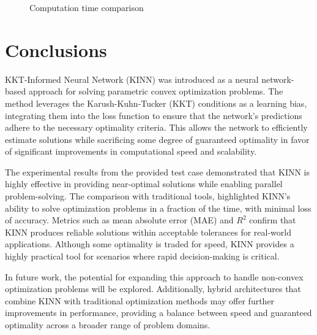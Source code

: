 \documentclass[
]{article}
\begin{document}
\begin{figure}


\caption{\label{fig-times}Computation time comparison}

\end{figure}%

\section{Conclusions}\label{conclusions}

KKT-Informed Neural Network (KINN) was introduced as a neural
network-based approach for solving parametric convex optimization
problems. The method leverages the Karush-Kuhn-Tucker (KKT) conditions
as a learning bias, integrating them into the loss function to ensure
that the network's predictions adhere to the necessary optimality
criteria. This allows the network to efficiently estimate solutions
while sacrificing some degree of guaranteed optimality in favor of
significant improvements in computational speed and scalability.

The experimental results from the provided test case demonstrated that
KINN is highly effective in providing near-optimal solutions while
enabling parallel problem-solving. The comparison with traditional
tools, highlighted KINN's ability to solve optimization problems in a
fraction of the time, with minimal loss of accuracy. Metrics such as
mean absolute error (MAE) and \(R^2\) confirm that KINN produces
reliable solutions within acceptable tolerances for real-world
applications. Although some optimality is traded for speed, KINN
provides a highly practical tool for scenarios where rapid
decision-making is critical.

In future work, the potential for expanding this approach to handle
non-convex optimization problems will be explored. Additionally, hybrid
architectures that combine KINN with traditional optimization methods
may offer further improvements in performance, providing a balance
between speed and guaranteed optimality across a broader range of
problem domains.


\printbibliography
\end{document}

